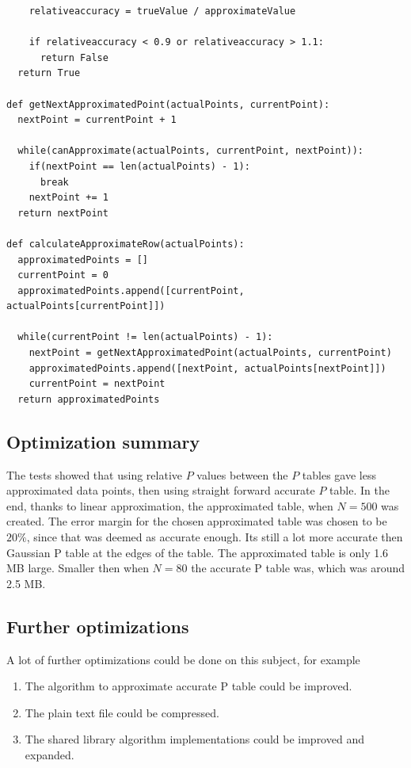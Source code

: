 \documentclass[12pt]{article}
\begin{document}
{\begin{lstlisting}
    relativeaccuracy = trueValue / approximateValue

    if relativeaccuracy < 0.9 or relativeaccuracy > 1.1:
      return False
  return True

def getNextApproximatedPoint(actualPoints, currentPoint):
  nextPoint = currentPoint + 1

  while(canApproximate(actualPoints, currentPoint, nextPoint)):
    if(nextPoint == len(actualPoints) - 1):
      break
    nextPoint += 1
  return nextPoint

def calculateApproximateRow(actualPoints):
  approximatedPoints = []
  currentPoint = 0
  approximatedPoints.append([currentPoint, actualPoints[currentPoint]])

  while(currentPoint != len(actualPoints) - 1):
    nextPoint = getNextApproximatedPoint(actualPoints, currentPoint)
    approximatedPoints.append([nextPoint, actualPoints[nextPoint]])
    currentPoint = nextPoint
  return approximatedPoints

\end{lstlisting}

\subsection{Optimization summary}
The tests showed that using relative $P$ values between the $P$ tables gave less approximated data points, then using straight forward accurate $P$ table. In the end, thanks to linear approximation, the approximated table, when $N=500$ was created. The error margin for the chosen approximated table was chosen to be $20\%$, since that was deemed as accurate enough. Its still a lot more accurate then Gaussian P table at the edges of the table. The approximated table is only 1.6 MB large. Smaller then when $N=80$ the accurate P table was, which was around 2.5 MB.

\subsection{Further optimizations}
A lot of further optimizations could be done on this subject, for example

\begin{enumerate}
\item The algorithm to approximate accurate P table could be improved.
\item The plain text file could be compressed.
\item The shared library algorithm implementations could be improved and expanded.
\end{enumerate}

}
\end{document}
